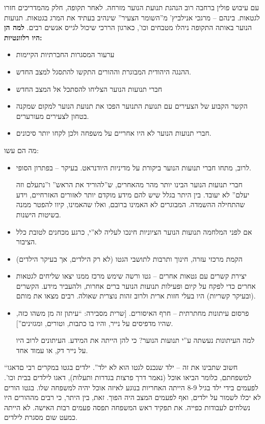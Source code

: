 \documentclass[]{article}
\begin{document}
    עם עיבוש פולין ברחבה רוב הנהגת תנועת הנוער מזרחה. לאחר תקופה, חלק מהמדריכים חזרו לגטאות. בינהם – מרגכי אנילביץ' מ''השומר הצעיר'' שינהיב בעתיד את המרג בגטאות. תנועות הנוער באותה התקופה ניהלו מטבחים וכו', כארגון הררכי שיכול לגייס אנשים רבים. \textbf{למה הן היו רלוונטיות: }
    \begin{itemize}
        \item ערעור המסגרות החברתיות הקיימות
        \item ההנגה היהודית המבוגרת וההורים התקשו להתסגל למצב החדש. 
        \item חברי תנועות הנוער הצליחו להסתכל אל המצב החדש
        \item הקשר הקבוע של הצעירים עם תנועת התנוער הפכו את תנועת הנוער למקום שמקנה בטחון לצעירים מעורערים. 
        \item חברי תנועות הנוער לא היו אחריים על משפחה ולכן לקחו יותר סיכונים. 
    \end{itemize}
    
    מה הם עשו: 
    \begin{itemize}
        \item לרוב, מתחו חברי תנועות הנוער ביקורת על מדיניות היודנראט. בעיקר – בפתרון הסופי. 
        
        חברי תנועות הנוער הבינו יותר מהר מהאחרים, ש''להוריד את הראש'' ו''נתעלם וזה יעלם'' לא יעובד. בין היתר בגלל שיש להם מידע מוקדם יותר לאזורים האזרחיים, וידע שהתחילה ההשמדה. המבוגרים לא האמינו ברובם, ואלו שהאמינו, קיוו להפטר ממנה בשיטות הישנות. 
        \item אם לפני המלחמה תנועות הנוער הציוניות חינכו לעליה לא''י, כרגע מכחנים לטובת כלל הציבור. 
        \item הקמת מרכזי עזרה, חינוך ותרבות לתושבי הגטו (לא רק הילדים, אך בעיקר הילדים)
        \item יצירת קשרים עם גטאות אחרים – גטו ורשה שימש מרכז ממנו יצאו שליחים לגטאות אחרים כדי לפקח על קיום ופעילות תנועות הנוער ברים אחרות, ולהעביר מידע. הקשרים (ובעיקר קשריות) היו בעלי חזות ארית ולרוב זהות נוצרית שאולה. רבים מצאו את מותם. 
        \item פרסום עיתונות מחתרתית – חרף האיסורים. [שרית מסבירה: ``עיתון זה מן משהו כזה, שהיו מדפיסים על נייר, והיו בו כתבות, וטורים, ומגזינים'']. 
        
        למה העיתונות נעשתה ע''י תנועות הנוער? כי להן הייתה את המידע. העיתונים לרוב היו על נייר דק, או עמוד אחד. 
    \end{itemize}
    
    ``חשוב שתבינו את זה – ילד שנכנס לגטו הוא לא ילד''. ילדים בגטו במקרים רבי םדאגו למשפחתם, כלומר הביאו אוכל (נאמר דרך פרצות בגדרות ותעלות), דאגו לילדים בבית וכו'. לפעמים בידי ילד בגיל 8-9 הייתה האחריות בנוגע לאיזה אוכל יהיה למשפחה שלו. בגטו הורים לא יכלו לשמור על ילדים, ואף לפעמים המצב היה הפוך. זאת, בין היתר, כי רבים מההורים היו נשלחים לעבודות כפייה. את תפקיד ראש המשפחה תפסה פעמים רבות האישה. לא הייתה כמעט שום מסגרת לילדים. 
    
\end{document}
